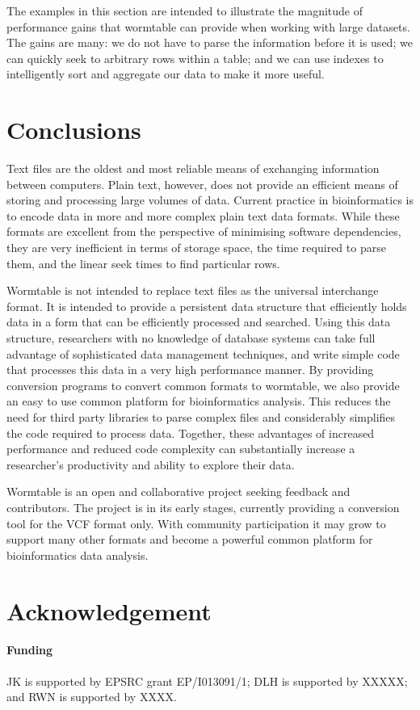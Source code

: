 \documentclass{bioinfo}
\begin{document}
The examples in this section are intended to illustrate the 
magnitude of performance gains that wormtable can provide 
when working with large datasets. The gains are many: we 
do not have to parse the information before it is used;
we can quickly seek to arbitrary rows within a table; and 
we can use indexes to intelligently sort and aggregate our
data to make it more useful.

\section{Conclusions}
Text files are the oldest and most reliable means of exchanging 
information between computers. Plain text, however, does not provide an efficient 
means of storing and processing large volumes of data. Current practice 
in bioinformatics is to encode data in more and more complex plain 
text data formats. While these formats are excellent from the perspective 
of minimising software dependencies, they are very inefficient in terms of 
storage space, the time required to parse them, and the linear
seek times to find particular rows.

Wormtable is not intended to replace text files as the universal 
interchange format. It is intended to provide a persistent data structure 
that efficiently holds data in a form that can be efficiently processed 
and searched. Using this data structure, researchers with no knowledge of 
database systems can take full advantage of sophisticated 
data management techniques, and write simple code that processes this 
data in a very high performance manner. 
By providing conversion programs to convert 
common formats to wormtable, we also provide an easy to 
use common platform for 
bioinformatics analysis. This reduces the need for third party libraries 
to parse complex files and considerably simplifies the code required 
to process data.
Together, these advantages of increased performance and reduced 
code complexity can substantially increase a researcher's 
productivity and ability to explore their data.

Wormtable is an open and collaborative project seeking feedback and 
contributors. The project is in its early stages, currently 
providing a conversion tool for the VCF format only. With community
participation it may grow to support many other formats and become
a powerful common platform for bioinformatics data analysis.

\section*{Acknowledgement}
\paragraph{Funding\textcolon}  
JK is supported by EPSRC grant EP/I013091/1; DLH is supported by XXXXX; 
and RWN is supported by XXXX.



\end{document}
